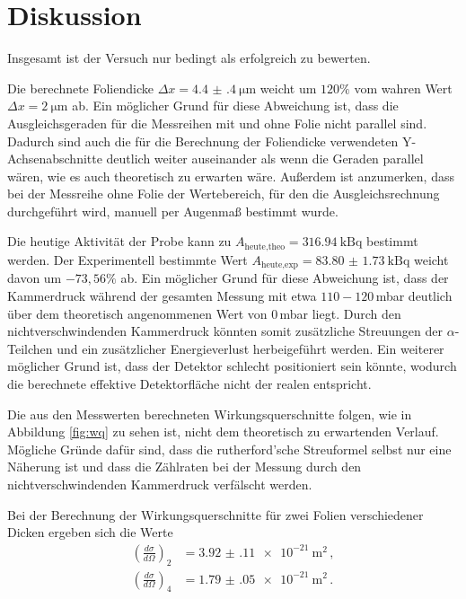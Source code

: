 \newpage
\section{Diskussion}
\label{sec:Diskussion}

Insgesamt ist der Versuch nur bedingt als erfolgreich zu bewerten.

Die berechnete Foliendicke $\Delta x = \SI{4.4(4)}{\micro\metre}$ weicht um
$120\%$ vom wahren Wert $\Delta x = \SI{2}{\micro\metre}$ ab. Ein möglicher Grund für diese
Abweichung ist, dass die Ausgleichsgeraden für die Messreihen mit und ohne Folie
nicht parallel sind. Dadurch sind auch die für die Berechnung der Foliendicke verwendeten
Y-Achsenabschnitte deutlich weiter auseinander als wenn die Geraden parallel wären,
wie es auch theoretisch zu erwarten wäre. Außerdem ist anzumerken, dass
bei der Messreihe ohne Folie der Wertebereich, für den die Ausgleichsrechnung durchgeführt wird,
manuell per Augenmaß bestimmt wurde.

Die heutige Aktivität der Probe kann zu $A_{\text{heute,theo}}= \SI{316.94}{\kilo\becquerel}$
bestimmt werden. Der Experimentell bestimmte Wert
$A_{\text{heute,exp}}=\SI{83.80(173)}{\kilo\becquerel}$ weicht davon um
$-73{,}56\%$ ab. Ein möglicher Grund für diese Abweichung ist, dass der Kammerdruck
während der gesamten Messung mit etwa $110-120$\,mbar deutlich über dem theoretisch
angenommenen Wert von $0$\,mbar liegt. Durch den nichtverschwindenden Kammerdruck
könnten somit zusätzliche Streuungen der $\alpha$-Teilchen und ein zusätzlicher
Energieverlust herbeigeführt werden. Ein weiterer möglicher Grund ist, dass der Detektor
schlecht positioniert sein könnte, wodurch die berechnete effektive Detektorfläche
nicht der realen entspricht.

Die aus den Messwerten berechneten Wirkungsquerschnitte folgen, wie in Abbildung
\ref{fig:wq} zu sehen ist, nicht dem theoretisch zu erwartenden Verlauf. Mögliche Gründe
dafür sind, dass die rutherford'sche Streuformel selbst nur eine Näherung ist und
dass die Zählraten bei der Messung durch den nichtverschwindenden Kammerdruck
verfälscht werden.

Bei der Berechnung der Wirkungsquerschnitte für zwei Folien verschiedener Dicken
ergeben sich die Werte
\begin{align*}
  \left(\frac{d \sigma}{d \Omega}\right)_2&=\SI{3.92(11)e-21}{\metre\squared} \,, \\
  \left(\frac{d \sigma}{d \Omega}\right)_4&=\SI{1.79(05)e-21}{\metre\squared} \,.
\end{align*}

